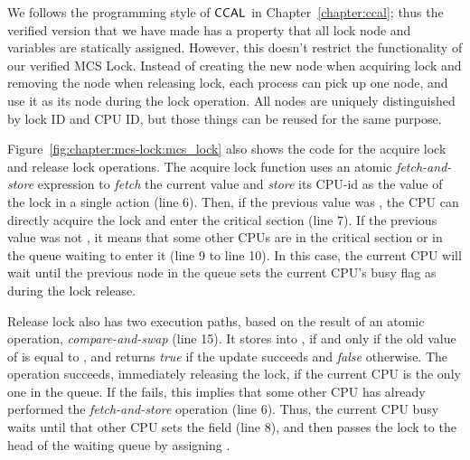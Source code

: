 We follows the programming style of $\mathsf{CCAL}$ in Chapter~\ref{chapter:ccal}; thus
the verified version that we have made has a property that all lock node and variables are statically assigned.
However, this doesn't restrict the functionality of our verified MCS Lock.
Instead of creating the new node when acquiring lock and removing the node when releasing lock,
each process can pick up one node, and use it as its node during the lock operation. 
All nodes are uniquely distinguished by lock ID and CPU ID, but those
things can be reused for the same purpose.

Figure~\ref{fig:chapter:mcs-lock:mcs_lock} also shows the code for the acquire lock and
release lock operations.  The acquire lock function uses an atomic {\em
fetch-and-store} expression to {\em fetch} the current 
value and {\em store} its CPU-id as the  value of
the lock in a single action (line 6).  Then, if the previous  value
was , the CPU can directly acquire the lock and enter the
critical section (line 7).  If the previous  value was not
, it means that some other CPUs are in the critical
section or in the queue waiting to enter it (line 9 to line 10).  In
this case, the current CPU will wait until the previous node in the
queue sets the current CPU's busy flag as  during the lock
release.

Release lock also has two execution paths, based on the result of an atomic operation, {\em compare-and-swap} (line 15).
It stores  into , if and only if the old value
of  is equal to , and returns {\em
  true} if the update succeeds and {\em false} otherwise.
The  operation succeeds, immediately releasing the lock,
if the current CPU is the only one in the queue.
If the  fails, this implies that some other CPU has
already performed the {\em fetch-and-store} operation (line 6). Thus, the current CPU busy waits until that other CPU sets the
 field  (line 8), and then passes the lock to the head of the
waiting queue by assigning .

